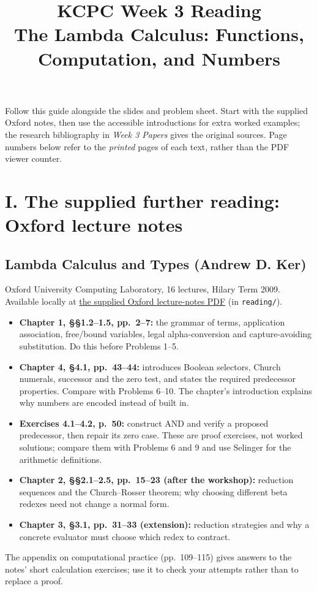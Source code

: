 \documentclass[11pt]{article}
\title{KCPC Week 3 Reading\\The Lambda Calculus: Functions, Computation, and Numbers}
\author{}\date{}
\begin{document}
\maketitle\thispagestyle{fancy}

Follow this guide alongside the slides and problem sheet. Start with the supplied Oxford notes, then use the accessible introductions for extra worked examples; the research bibliography in \emph{Week 3 Papers} gives the original sources. Page numbers below refer to the \emph{printed} pages of each text, rather than the PDF viewer counter.

\section*{I. The supplied further reading: Oxford lecture notes}
\subsection*{Lambda Calculus and Types (Andrew D. Ker)}
Oxford University Computing Laboratory, 16 lectures, Hilary Term 2009. Available locally at
\href{run:reading/lambdacalculus-lecture-notes-ht2009.pdf}{the supplied Oxford lecture-notes PDF} (in \texttt{reading/}).

\begin{itemize}
  \item \textbf{Chapter 1, \S\S1.2--1.5, pp.~2--7:} the grammar of terms, application association, free/bound variables, legal alpha-conversion and capture-avoiding substitution. Do this before Problems 1--5.
  \item \textbf{Chapter 4, \S4.1, pp.~43--44:} introduces Boolean selectors, Church numerals, successor and the zero test, and states the required predecessor properties. Compare with Problems 6--10. The chapter's introduction explains why numbers are encoded instead of built in.
  \item \textbf{Exercises 4.1--4.2, p.~50:} construct AND and verify a proposed predecessor, then repair its zero case. These are proof exercises, not worked solutions; compare them with Problems 6 and 9 and use Selinger for the arithmetic definitions.
  \item \textbf{Chapter 2, \S\S2.1--2.5, pp.~15--23 (after the workshop):} reduction sequences and the Church--Rosser theorem; why choosing different beta redexes need not change a normal form.
  \item \textbf{Chapter 3, \S3.1, pp.~31--33 (extension):} reduction strategies and why a concrete evaluator must choose which redex to contract.
\end{itemize}
The appendix on computational practice (pp.~109--115) gives answers to the notes' short calculation exercises; use it to check your attempts rather than to replace a proof.
\end{document}
